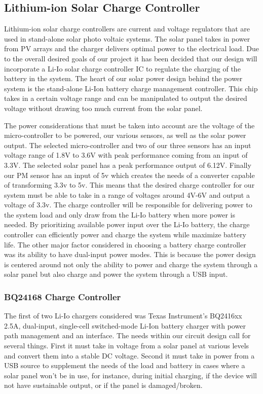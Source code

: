 \subsection{Lithium-ion Solar Charge Controller}
Lithium-ion solar charge controllers are current and voltage regulators that are used in stand-alone solar photo voltaic systems. The solar panel takes in power from PV arrays and the charger delivers optimal power to the electrical load. Due to the overall desired goals of our project it has been decided that our design will incorporate a Li-Io solar charge controller IC to regulate the charging of the battery in the system. The heart of our solar power design behind the power system is the stand-alone Li-Ion battery charge management controller. This chip takes in a certain voltage range and can be manipulated to output the desired voltage without drawing too much current from the solar panel. 

The power considerations that must be taken into account are the voltage of the micro-controller to be powered, our various sensors, as well as the solar power output. The selected micro-controller and two of our three sensors has an input voltage range of 1.8V to 3.6V with peak performance coming from an input of 3.3V. The selected solar panel has a peak performance output of 6.12V. Finally our PM sensor has an input of 5v which creates the needs of a converter capable of transforming 3.3v to 5v. This means that the desired charge controller for our system must be able to take in a range of voltages around 4V-6V and output a voltage of 3.3v. The charge controller will be responsible for delivering power to the system load and only draw from the Li-Io battery when more power is needed. By prioritizing available power input over the Li-Io battery, the charge controller can efficiently power and charge the system while maximize battery life. The other major factor considered in choosing a battery charge controller was its ability to have dual-input power modes. This is because the power design is centered around not only the ability to power and charge the system through a solar panel but also charge and power the system through a USB input.
\cite{Solar-Charge-Controller-Basics}
\subsubsection{BQ24168 Charge Controller}
The first of two Li-Io chargers considered was Texas Instrument's BQ2416xx 2.5A, dual-input, single-cell switched-mode Li-Ion battery charger with power path management and an \iic interface. The needs within our circuit design call for several things. First it must take in voltage from a solar panel at various levels and convert them into a stable DC voltage. Second it must take in power from a USB source to supplement the needs of the load and battery in cases where a solar panel won't be in use, for instance, during initial charging, if the device will not have sustainable output, or if the panel is damaged/broken.

